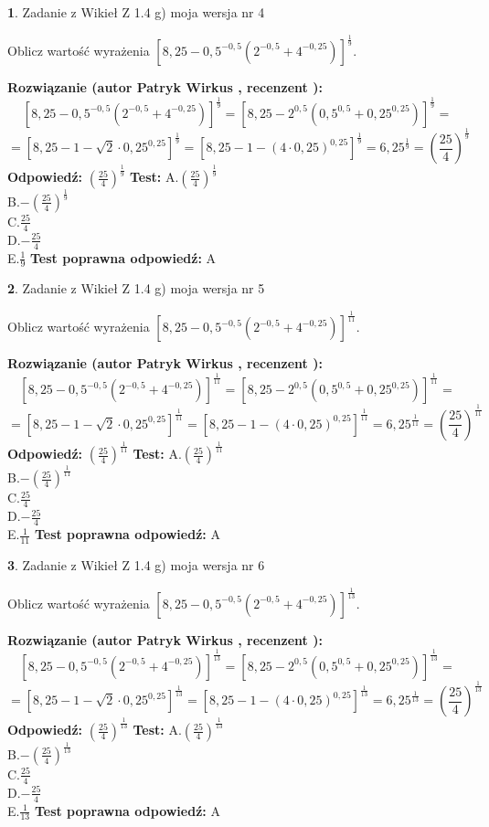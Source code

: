 \documentclass[12pt, a4paper]{article}
\theoremstyle{definition} %
\newtheorem{zad}{}
\newcommand{\zadStart}[1]{\begin{zad}#1\newline}
\newcommand{\zadStop}{\end{zad}}
\newcommand{\rozwStart}[2]{\noindent \textbf{Rozwiązanie (autor #1 , recenzent #2): }\newline}
\newcommand{\rozwStop}{\newline}
\newcommand{\odpStart}{\noindent \textbf{Odpowiedź:}\newline}
\newcommand{\odpStop}{\newline}
\newcommand{\testStart}{\noindent \textbf{Test:}\newline}
\newcommand{\testStop}{\newline}
\newcommand{\kluczStart}{\noindent \textbf{Test poprawna odpowiedź:}\newline}
\newcommand{\kluczStop}{\newline}
\begin{document}
\zadStart{Zadanie z Wikieł Z 1.4 g) moja wersja nr 4}

Oblicz wartość wyrażenia $[8,25-0,5^{-0,5}(2^{-0,5}+4^{-0,25})]^{\frac{1}{9}}$.
\zadStop
\rozwStart{Patryk Wirkus}{}
$$[8,25-0,5^{-0,5}(2^{-0,5}+4^{-0,25})]^{\frac{1}{9}} = [8,25-2^{0,5}(0,5^{0,5}+0,25^{0,25})]^{\frac{1}{9}} =$$
$$=[8,25 - 1 - \sqrt{2} \cdot 0,25^{0,25}]^{\frac{1}{9}} = [8,25 - 1 - (4\cdot 0,25)^{0,25}]^{\frac{1}{9}} = 6,25^{\frac{1}{9}} = (\frac{25}{4})^{\frac{1}{9}}$$
\rozwStop
\odpStart
$(\frac{25}{4})^{\frac{1}{9}}$
\odpStop
\testStart
A.$(\frac{25}{4})^{\frac{1}{9}}$\\ B.$-(\frac{25}{4})^{\frac{1}{9}}$\\ C.$\frac{25}{4}$\\ D.$-\frac{25}{4}$\\ E.$\frac{1}{9}$
\testStop
\kluczStart
A
\kluczStop



\zadStart{Zadanie z Wikieł Z 1.4 g) moja wersja nr 5}

Oblicz wartość wyrażenia $[8,25-0,5^{-0,5}(2^{-0,5}+4^{-0,25})]^{\frac{1}{11}}$.
\zadStop
\rozwStart{Patryk Wirkus}{}
$$[8,25-0,5^{-0,5}(2^{-0,5}+4^{-0,25})]^{\frac{1}{11}} = [8,25-2^{0,5}(0,5^{0,5}+0,25^{0,25})]^{\frac{1}{11}} =$$
$$=[8,25 - 1 - \sqrt{2} \cdot 0,25^{0,25}]^{\frac{1}{11}} = [8,25 - 1 - (4\cdot 0,25)^{0,25}]^{\frac{1}{11}} = 6,25^{\frac{1}{11}} = (\frac{25}{4})^{\frac{1}{11}}$$
\rozwStop
\odpStart
$(\frac{25}{4})^{\frac{1}{11}}$
\odpStop
\testStart
A.$(\frac{25}{4})^{\frac{1}{11}}$\\ B.$-(\frac{25}{4})^{\frac{1}{11}}$\\ C.$\frac{25}{4}$\\ D.$-\frac{25}{4}$\\ E.$\frac{1}{11}$
\testStop
\kluczStart
A
\kluczStop



\zadStart{Zadanie z Wikieł Z 1.4 g) moja wersja nr 6}

Oblicz wartość wyrażenia $[8,25-0,5^{-0,5}(2^{-0,5}+4^{-0,25})]^{\frac{1}{13}}$.
\zadStop
\rozwStart{Patryk Wirkus}{}
$$[8,25-0,5^{-0,5}(2^{-0,5}+4^{-0,25})]^{\frac{1}{13}} = [8,25-2^{0,5}(0,5^{0,5}+0,25^{0,25})]^{\frac{1}{13}} =$$
$$=[8,25 - 1 - \sqrt{2} \cdot 0,25^{0,25}]^{\frac{1}{13}} = [8,25 - 1 - (4\cdot 0,25)^{0,25}]^{\frac{1}{13}} = 6,25^{\frac{1}{13}} = (\frac{25}{4})^{\frac{1}{13}}$$
\rozwStop
\odpStart
$(\frac{25}{4})^{\frac{1}{13}}$
\odpStop
\testStart
A.$(\frac{25}{4})^{\frac{1}{13}}$\\ B.$-(\frac{25}{4})^{\frac{1}{13}}$\\ C.$\frac{25}{4}$\\ D.$-\frac{25}{4}$\\ E.$\frac{1}{13}$
\testStop
\kluczStart
A
\kluczStop
\end{document}
